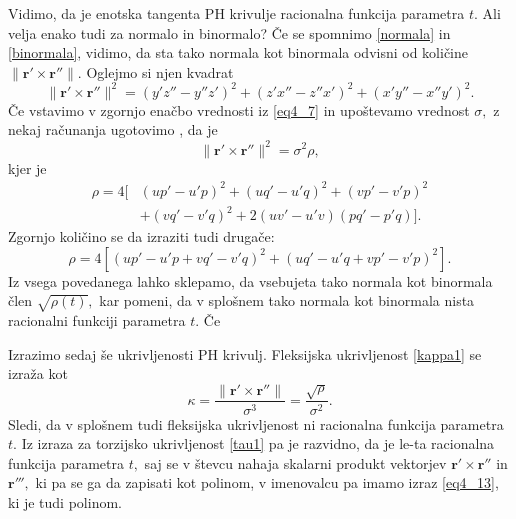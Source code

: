 \documentclass[12pt,a4paper,twoside]{article}
\theoremstyle{definition} %
\theoremstyle{plain} %
\numberwithin{equation}{section}  %
\newcommand{\rV}{\mathbf{r}}
\begin{document}
Vidimo, da je enotska tangenta PH krivulje racionalna funkcija parametra $t.$ Ali velja enako tudi za normalo in binormalo? Če se spomnimo \eqref{normala} in \eqref{binormala}, vidimo, da sta tako normala kot binormala odvisni od količine $\lVert \rV' \times \rV'' \rVert.$ Oglejmo si njen kvadrat
\begin{equation}
	\label{eq4_12}
	\lVert \rV' \times \rV'' \rVert^2=(y'z''-y''z')^2+(z'x''-z''x')^2+(x'y''-x''y')^2.
\end{equation}
Če vstavimo v zgornjo enačbo vrednosti iz \eqref{eq4_7} in upoštevamo vrednost $\sigma,$ z nekaj računanja ugotovimo \cite{farouki2002exact}, da je
\begin{equation}
	\label{eq4_13}
	\lVert \rV' \times \rV'' \rVert^2=\sigma^2\rho,
\end{equation}
kjer je
\begin{align}
	\rho=4[&(up'-u'p)^2+(uq'-u'q)^2+(vp'-v'p)^2 \nonumber \\
	&+(vq'-v'q)^2+2(uv'-u'v)(pq'-p'q)]. \label{rho1}
\end{align}
Zgornjo količino se da izraziti \cite{beltranmonterde} tudi drugače:
\begin{equation}
	\label{rho2}
	\rho=4[(up'-u'p+vq'-v'q)^2+(uq'-u'q+vp'-v'p)^2].
\end{equation}
Iz vsega povedanega lahko sklepamo, da vsebujeta tako normala kot binormala člen $\sqrt{\rho(t)},$ kar pomeni, da v splošnem tako normala kot binormala nista racionalni funkciji parametra $t.$ Če

Izrazimo sedaj še ukrivljenosti PH krivulj. Fleksijska ukrivljenost \eqref{kappa1} se izraža kot
\begin{equation}
	\label{kappa2}
	\kappa=\frac{\lVert \rV' \times \rV'' \rVert}{\sigma^3}=\frac{\sqrt{\rho}}{\sigma^2}.
\end{equation}
Sledi, da v splošnem tudi fleksijska ukrivljenost ni racionalna funkcija parametra $t.$ Iz izraza za torzijsko ukrivljenost \eqref{tau1} pa je razvidno, da je le-ta racionalna funkcija parametra $t,$ saj se v števcu nahaja skalarni produkt vektorjev $\rV'\times \rV''$ in $\rV''',$ ki pa se ga da zapisati kot polinom, v imenovalcu pa imamo izraz \eqref{eq4_13}, ki je tudi polinom.
\end{document}
